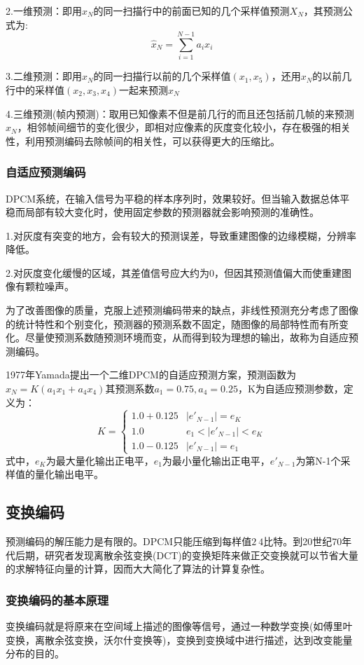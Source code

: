 \documentclass[11pt]{article}
\begin{document}
2.一维预测：即用$x_N$的同一扫描行中的前面已知的几个采样值预测$X_N$，其预测公式为:$$\hat{x}_N = \sum_{i=1}^{N-1}a_ix_i$$

3.二维预测：即用$x_N$的同一扫描行以前的几个采样值$(x_1,x_5)$，还用$x_N$的以前几行中的采样值$(x_2,x_3,x_4)$一起来预测$x_N$

4.三维预测(帧内预测)：取用已知像素不但是前几行的而且还包括前几帧的来预测$x_N$，相邻帧间细节的变化很少，即相对应像素的灰度变化较小，存在极强的相关性，利用预测编码去除帧间的相关性，可以获得更大的压缩比。

\subsubsection{自适应预测编码}
DPCM系统，在输入信号为平稳的样本序列时，效果较好。但当输入数据总体平稳而局部有较大变化时，使用固定参数的预测器就会影响预测的准确性。

1.对灰度有突变的地方，会有较大的预测误差，导致重建图像的边缘模糊，分辨率降低。

2.对灰度变化缓慢的区域，其差值信号应大约为0，但因其预测值偏大而使重建图像有颗粒噪声。

为了改善图像的质量，克服上述预测编码带来的缺点，非线性预测充分考虑了图像的统计特性和个别变化，预测器的预测系数不固定，随图像的局部特性而有所变化。尽量使预测系数随预测环境而变，从而得到较为理想的输出，故称为自适应预测编码。

1977年Yamada提出一个二维DPCM的自适应预测方案，预测函数为$\hat{x}_N = K(a_1x_1 + a_4x_4)$其预测系数$a_1=0.75,a_4=0.25$，K为自适应预测参数，定义为：
$$K = \left\{\begin{matrix}
	1.0 + 0.125 &\left | e'_{N-1}\right | = e_K \\ 
	1.0 &e_1< \left | e'_{N-1}\right |< e_K \\
	1.0 - 0.125 &\left | e'_{N-1}\right | = e_1 
\end{matrix}\right.$$
式中，$e_K$为最大量化输出正电平，$e_1$为最小量化输出正电平，$e'_{N-1}$为第N-1个采样值的量化输出电平。

\subsection{变换编码}
预测编码的解压能力是有限的。DPCM只能压缩到每样值$2~4$比特。到20世纪70年代后期，研究者发现离散余弦变换(DCT)的变换矩阵来做正交变换就可以节省大量的求解特征向量的计算，因而大大简化了算法的计算复杂性。
\subsubsection{变换编码的基本原理}
变换编码就是将原来在空间域上描述的图像等信号，通过一种数学变换(如傅里叶变换，离散余弦变换，沃尔什变换等)，变换到变换域中进行描述，达到改变能量分布的目的。
\end{document}
